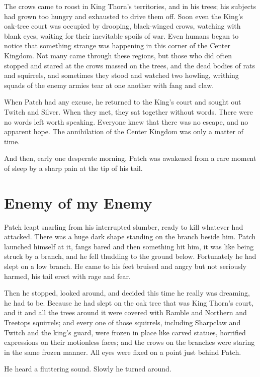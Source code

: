 \documentclass[12pt]{book}
\begin{document}
The crows came to roost in King Thorn's territories, and in his trees; his subjects had grown too hungry and exhausted to drive them off. Soon even the King's oak-tree court was occupied by drooping, black-winged crows, watching with blank eyes, waiting for their inevitable spoils of war. Even humans began to notice that something strange was happening in this corner of the Center Kingdom. Not many came through these regions, but those who did often stopped and stared at the crows massed on the trees, and the dead bodies of rats and squirrels, and sometimes they stood and watched two howling, writhing squads of the enemy armies tear at one another with fang and claw.

When Patch had any excuse, he returned to the King's court and sought out Twitch and Silver. When they met, they sat together without words. There were no words left worth speaking. Everyone knew that there was no escape, and no apparent hope. The annihilation of the Center Kingdom was only a matter of time.

And then, early one desperate morning, Patch was awakened from a rare moment of sleep by a sharp pain at the tip of his tail.


\section{Enemy of my Enemy}

Patch leapt snarling from his interrupted slumber, ready to kill whatever had attacked. There was a huge dark shape standing on the branch beside him. Patch launched himself at it, fangs bared %
and then something hit him, it was like being struck by a branch, and he fell thudding to the ground below. Fortunately he had slept on a low branch. He came to his feet bruised and angry but not seriously harmed, his tail erect with rage and fear.

Then he stopped, looked around, and decided this time he really was dreaming, he had to be. Because he had slept on the oak tree that was King Thorn's court, and it and all the trees around it were covered with Ramble and Northern and Treetops squirrels; and every one of those squirrels, including Sharpclaw and Twitch and the king's guard, were frozen in place like carved statues, horrified expressions on their motionless faces; and the crows on the branches were staring in the same frozen manner. All eyes were fixed on a point just behind Patch.

He heard a fluttering sound. Slowly he turned around.
\end{document}
